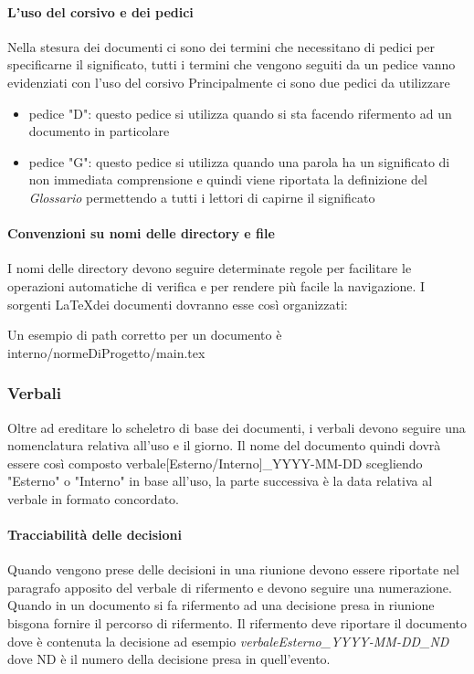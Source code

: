   \paragraph{L'uso del corsivo e dei pedici}
  Nella stesura dei documenti ci sono dei termini che necessitano di pedici per
  specificarne il significato, tutti i termini che vengono seguiti da un pedice
  vanno evidenziati con l'uso del corsivo
  Principalmente ci sono due pedici da utilizzare
    \begin{itemize}
      \item pedice "D": questo pedice si utilizza quando si sta facendo rifermento
      ad un documento in particolare
      \item pedice "G": questo pedice si utilizza quando una parola ha un significato
      di non immediata comprensione e quindi viene riportata la definizione del
      \textit{Glossario}\doc
      permettendo a tutti i lettori di capirne il significato
    \end{itemize}

  \paragraph{Convenzioni su nomi delle directory e file}
  I nomi delle directory devono seguire determinate regole per facilitare le operazioni
  automatiche di verifica e per rendere più facile la navigazione.
  I sorgenti \LaTeX \space dei documenti dovranno esse così organizzati:


  Un esempio di path corretto per un documento è interno/normeDiProgetto/main.tex
  \subsubsection{Verbali}
  Oltre ad ereditare lo scheletro di base dei documenti, i verbali devono seguire
  una nomenclatura relativa all'uso e il giorno.
  Il nome del documento quindi dovrà essere così composto
  verbale[Esterno/Interno]\_YYYY-MM-DD scegliendo "Esterno" o "Interno" in base
  all'uso, la parte successiva è la data relativa al verbale in formato concordato.

    \paragraph{Tracciabilità delle decisioni}
      Quando vengono prese delle decisioni in una riunione devono essere
      riportate nel paragrafo apposito del verbale di rifermento e devono
      seguire una numerazione.
      Quando in un documento si fa rifermento ad una decisione presa in riunione
      bisgona fornire il percorso di rifermento.
      Il rifermento deve riportare il documento dove è contenuta la decisione
      ad esempio \textit{verbaleEsterno\_YYYY-MM-DD\_ND} dove ND è il numero della
      decisione presa in quell'evento.


